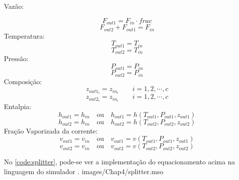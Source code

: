 \begin{flushleft}
Vazão:
\end{flushleft}
\begin{equation}
F_{out1} = F_{in} \cdot frac
\end{equation}
\begin{equation}
F_{out2} + F_{out1} = F_{in}
\end{equation}
Temperatura:
\begin{equation}
T_{out1} = T_{in}
\end{equation}
\begin{equation}
T_{out2} = T_{in}
\end{equation}
Pressão:
\begin{equation}
P_{out1} = P_{in}
\end{equation}
\begin{equation}
P_{out2} = P_{in}
\end{equation}
Composição:
\begin{equation}
z_{out1_i} = z_{in_i} \qquad i=1,2,\cdots,c
\end{equation}
\begin{equation}
z_{out2_i} = z_{in_i} \qquad i=1,2,\cdots,c
\end{equation}
Entalpia:
\begin{equation}
h_{out1} = h_{in} \quad\textrm{ou}\quad h_{out1} = h(T_{out1}, P_{out1},
z_{out1})
\end{equation}
\begin{equation}
h_{out2} = h_{in} \quad\textrm{ou}\quad h_{out2} = h(T_{out2}, P_{out2},
z_{out2})
\end{equation}
Fração Vaporizada da corrente:
\begin{equation}
v_{out1} = v_{in} \quad\textrm{ou}\quad v_{out1} = v(T_{out1}, P_{out1},
z_{out1})
\end{equation}
\begin{equation}
v_{out2} = v_{in} \quad\textrm{ou}\quad v_{out2} = v(T_{out2}, P_{out2},
z_{out2})
\end{equation}

No \autoref{code:splitter}, pode-se ver a implementação do equacionamento acima
na linguagem do simulador \emso.
 {images/Chap4/splitter.mso}

